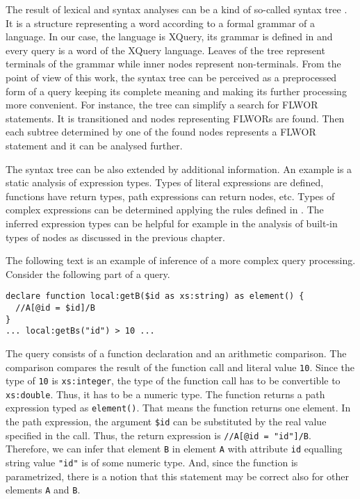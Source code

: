 The result of lexical and syntax analyses can be a kind of so-called syntax tree \cite{compilers}. It is a structure representing a word according to a formal grammar of a language. In our case, the language is XQuery, its grammar is defined in \cite{w3c_xquery} and every query is a word of the XQuery language. Leaves of the tree represent terminals of the grammar while inner nodes represent non-terminals. From the point of view of this work, the syntax tree can be perceived as a preprocessed form of a query keeping its complete meaning and making its further processing more convenient. For instance, the tree can simplify a search for FLWOR statements. It is transitioned and nodes representing FLWORs are found. Then each subtree determined by one of the found nodes represents a FLWOR statement and it can be analysed further.

The syntax tree can be also extended by additional information. An example is a static analysis of expression types. Types of literal expressions are defined, functions have return types, path expressions can return nodes, etc. Types of complex expressions can be determined applying the rules defined in \cite{w3c_xquery}. The inferred expression types can be helpful for example in the analysis of built-in types of nodes as discussed in the previous chapter. 

The following text is an example of inference of a more complex query processing. Consider the following part of a query.
\begin{verbatim}
declare function local:getB($id as xs:string) as element() {
  //A[@id = $id]/B
}
... local:getBs("id") > 10 ...
\end{verbatim}
The query consists of a function declaration and an arithmetic comparison. The comparison compares the result of the function call and literal value \texttt{10}. Since the type of \texttt{10} is \texttt{xs:integer}, the type of the function call has to be convertible to \texttt{xs:double}. Thus, it has to be a numeric type. The function returns a path expression typed as \texttt{element()}. That means the function returns one element. In the path expression, the argument \texttt{\$id} can be substituted by the real value specified in the call. Thus, the return expression is \texttt{//A[@id = "id"]/B}. Therefore, we can infer that element \texttt{B} in element \texttt{A} with attribute \texttt{id} equalling string value \texttt{"id"} is of some numeric type. And, since the function is parametrized, there is a notion that this statement may be correct also for other elements \texttt{A} and \texttt{B}.

